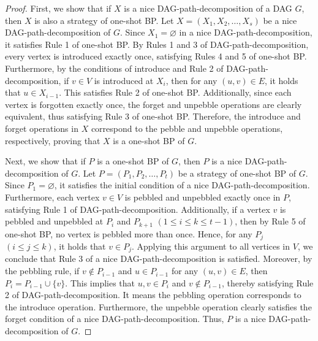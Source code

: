 \documentclass[runningheads]{llncs}
\theoremstyle{plain}
\theoremstyle{definition}
\begin{document}
\begin{proof}
    First, we show that if $X$ is a nice DAG-path-decomposition of a DAG $G$, then $X$ is also a strategy of one-shot BP. Let $X=(X_1, X_2, \dots, X_s)$ be a nice DAG-path-decomposition of $G$. Since $X_1 = \varnothing$ in a nice DAG-path-decomposition, it satisfies Rule 1 of one-shot BP. By Rules 1 and 3 of DAG-path-decomposition, every vertex is introduced exactly once, satisfying Rules 4 and 5 of one-shot BP. Furthermore, by the conditions of introduce and Rule 2 of DAG-path-decomposition, if $v \in V$ is introduced at $X_i$, then for any $(u, v) \in E$, it holds that $u \in X_{i-1}$. This satisfies Rule 2 of one-shot BP. Additionally, since each vertex is forgotten exactly once, the forget and unpebble operations are clearly equivalent, thus satisfying Rule 3 of one-shot BP. Therefore, the introduce and forget operations in $X$ correspond to the pebble and unpebble operations, respectively, proving that $X$ is a one-shot BP of $G$.

    Next, we show that if $P$ is a one-shot BP of $G$, then $P$ is a nice DAG-path-decomposition of $G$. Let $P=(P_1, P_2, \dots, P_t)$ be a strategy of one-shot BP of $G$. Since $P_1 = \varnothing$, it satisfies the initial condition of a nice DAG-path-decomposition. Furthermore, each vertex $v \in V$ is pebbled and unpebbled exactly once in $P$, satisfying Rule 1 of DAG-path-decomposition. Additionally, if a vertex $v$ is pebbled and unpebbled at $P_i$ and $P_{k+1}$ $(1 \leq i \leq k \leq t-1)$, then by Rule 5 of one-shot BP, no vertex is pebbled more than once. Hence, for any $P_j$ $(i \leq j \leq k)$, it holds that $v \in P_j$. Applying this argument to all vertices in $V$, we conclude that Rule 3 of a nice DAG-path-decomposition is satisfied. Moreover, by the pebbling rule, if $v \notin P_{i-1}$ and $u \in P_{i-1}$ for any $(u, v) \in E$, then $P_i = P_{i-1} \cup \{v\}$. This implies that $u, v \in P_i$ and $v \notin P_{i-1}$, thereby satisfying Rule 2 of DAG-path-decomposition. It means the pebbling operation corresponds to the introduce operation. Furthermore, the unpebble operation clearly satisfies the forget condition of a nice DAG-path-decomposition. Thus, $P$ is a nice DAG-path-decomposition of $G$.
\end{proof}
\end{document}
